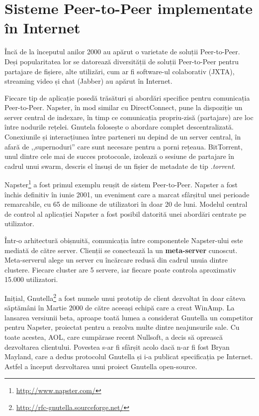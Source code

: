 \section{Sisteme Peer-to-Peer implementate în Internet}
\label{sec:p2p-systems:p2p-internet}

Încă de la începutul anilor 2000 au apărut o varietate de soluții Peer-to-Peer.
Deși popularitatea lor se datorează diversității de soluții Peer-to-Peer pentru
partajare de fișiere, alte utilizări, cum ar fi software-ul colaborativ
(JXTA), streaming video și chat (Jabber) au apărut în Internet.

Fiecare tip de aplicație posedă trăsături și abordări specifice pentru
comunicația Peer-to-Peer. Napster, în mod similar cu DirectConnect,
pune la dispoziție un server central de indexare, în timp ce comunicația
propriu-zisă (partajare) are loc între nodurile rețelei. Gnutela folosește
o abordare complet descentralizată. Conexiunile și interacțiunea
între parteneri nu depind de un server central, în afară de ,,supernoduri''
care sunt necesare pentru a porni rețeaua. BitTorrent, unul dintre cele
mai de succes protocoale, izolează o sesiune de partajare în cadrul unui
swarm, descris el însuși de un fișier de metadate de tip \textit{.torrent}.

Napster\footnote{\url{http://www.napster.com/}} a fost primul exemplu
reușit de sistem Peer-to-Peer. Napster a fost închis definitiv în iunie 2001,
un eveniment care a marcat sfârșitul unei perioade remarcabile, cu 65 de
milioane de utilizatori în doar 20 de luni. Modelul central de control
al aplicației Napster a fost posibil datorită unei abordări centrate pe
utilizator.

Într-o arhitectură obișnuită, comunicația între componentele Napster-ului
este mediată de către server. Clienții se conectează la un \textbf{meta-server}
cunoscut. Meta-serverul alege un server cu încărcare redusă din cadrul
unuia dintre clustere. Fiecare cluster are 5 servere, iar fiecare poate
controla aproximativ 15.000 utilizatori.

Inițial, Gnutella\footnote{\url{http://rfc-gnutella.sourceforge.net/}}
a fost numele unui prototip de client dezvoltat în doar câteva săptămâni
în Martie 2000 de către aceeași echipă care a creat WinAmp. La lansarea
versiunii beta, aproape toată lumea a considerat Gnutella un competitor
pentru Napster, proiectat pentru a rezolva multe dintre neajunsurile sale.
Cu toate acestea, AOL, care cumpărase recent Nullsoft, a decis să oprească
dezvoltarea clientului. Povestea s-ar fi sfârșit acolo dacă n-ar fi fost
Bryan Mayland, care a dedus protocolul Gnutella și i-a publicat specificația
pe Internet. Astfel a început dezvoltarea unui proiect Gnutella open-source.

